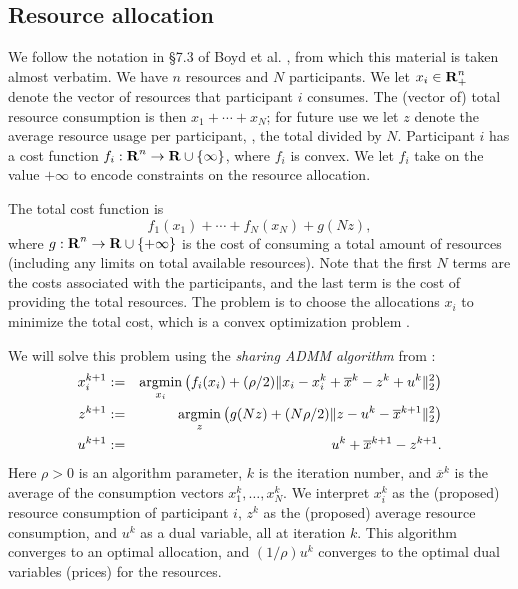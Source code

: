 




\subsection{Resource allocation}

We follow the notation in \S 7.3 of Boyd et al. \cite{ADMM},
from which this material is taken almost verbatim.
We have $n$ resources and $N$ participants.
We let $x_i \in {\mbox{\textbf{R}}}^n_+$ denote the vector of resources 
that participant $i$ consumes.  
The (vector of) total resource consumption is then $x_1 + \cdots + x_N$;
for future use we let $z$ denote the average resource
usage per participant, \ie, the total divided by $N$.
Participant $i$ has a cost function $f_i:{\mbox{\textbf{R}}}^n \to {\mbox{\textbf{R}}} \cup
\{\infty\}$, where
$f_i$ is convex.  We let $f_i$ take on the value $+\infty$ to encode
constraints on the resource allocation.

The total cost function is
\[
f_1(x_1) + \cdots + f_N (x_N) + g(Nz),
\]
where $g: {\mbox{\textbf{R}}}^n \to {\mbox{\textbf{R}}} \cup \{+\infty\}$ is the cost
of consuming a total amount of resources (including any limits on total
available resources).
Note that the first $N$ terms are the costs associated with the
participants, and the last term is the cost of providing the total
resources.
The problem is to choose the allocations $x_i$ to minimize the total cost,
which is a convex optimization problem \cite{BoVa,ADMM}.

We will solve this problem using the \emph{sharing ADMM algorithm}
from \cite{ADMM}:
\begin{eqnarray*}
x_i^{k+1} &:=&  \mathop{\mathrm{argmin}}_{x_i} \left( f_i(x_i) + (\rho/2)
\|x_i-x_i^k+\overline x^k-z^k+u^k\|^2_2\right)\\
z^{k+1} &:=&  \mathop{\mathrm{argmin}}_{z} \left( g(Nz) + (N\rho/2)
\|z - u^k - \overline x^{k+1} \|_2^2 \right)\\
u^{k+1} &:=&  u^k + \overline x^{k+1}- z^{k+1}.
\end{eqnarray*}
Here $\rho>0$ is an algorithm parameter,
$k$ is the iteration number,
and $\overline x^k$ is the average of the consumption vectors
$x^k_1, \ldots, x^k_N$.
We interpret $x_i^k$ as the (proposed) resource consumption of 
participant $i$,
$z^k$ as the (proposed) average resource consumption,
and $u^k$ as a dual variable, all at iteration $k$.
This algorithm converges to an optimal allocation,
and $(1/\rho)u^k$ converges
to the optimal dual variables (prices) for the resources.

